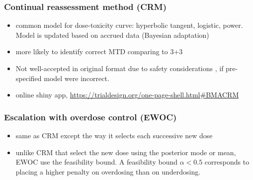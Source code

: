 \documentclass[
]{article}
\providecommand{\tightlist}{%
  \setlength{\itemsep}{0pt}\setlength{\parskip}{0pt}}
\begin{document}
\hypertarget{continual-reassessment-method-crm}{%
\subsubsection{Continual reassessment method
(CRM)}\label{continual-reassessment-method-crm}}

\begin{itemize}
\item
  common model for dose-toxicity curve: hyperbolic tangent, logistic,
  power. Model is updated based on accrued data (Bayesian adaptation)
\item
  more likely to identify correct MTD comparing to 3+3
\item
  Not well-accepted in original format due to safety considerations , if
  pre-specified model were incorrect.
\item
  online shiny app,
  \url{https://trialdesign.org/one-page-shell.html\#BMACRM}
\end{itemize}

\hypertarget{escalation-with-overdose-control-ewoc}{%
\subsubsection{Escalation with overdose control
(EWOC)}\label{escalation-with-overdose-control-ewoc}}

\begin{itemize}
\tightlist
\item
  same as CRM except the way it selects each successive new dose
\item
  unlike CRM that select the new dose using the posterior mode or mean,
  EWOC use the feasibility bound. A feasibility bound \(\alpha < 0.5\)
  corresponds to placing a higher penalty on overdosing than on
  underdosing.
\end{itemize}
\end{document}
